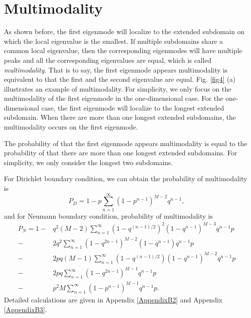 \documentclass[a4paper,11pt]{article}
\begin{document}
\section{Multimodality}\label{multimodality}

As shown before, the first eigenmode will localize to the extended subdomain on which the local eigenvalue is the smallest. If multiple subdomains share a common local eigenvalue, then the corresponding eigenmodes will have multiple peaks and all the corresponding eigenvalues are equal, which is called \emph{multimodality}. That is to say, the first eigenmode appears multimodality is equivalent to that the first and the second eigenvalue are equal. Fig. \ref{fig4} (a) illustrates an example of multimodality. For simplicity, we only focus on the multimodality of the first eigenmode in the one-dimensional case. For the one-dimensional case, the first eigenmode will localize to the longest extended subdomain. When there are more than one longest extended subdomains, the multimodality occurs on the first eigenmode.

The probability of that the first eigenmode appears multimodality is equal to the probability of that there are more than one longest extended subdomains. For simplicity, we only consider the longest two subdomains.

For Dirichlet boundary condition, we can obtain the probability of multimodality is
\begin{equation}\label{multiD}
P_D = 1 - p \sum_{n=1}^{\infty} (1 - p^{n-1})^{M-2} q^{n-1},
\end{equation}
and for Neumann boundary condition, probability of multimodality is
\begin{equation}\label{multiN}
\begin{split}
P_N = 1 - & q^2 (M-2) \sum_{n=1}^{\infty} (1 - q^{(n-1)/2})^2 (1 - q^{n-1})^{M-3} q^{n-1} p \\
- & 2 q^2 \sum_{n=1}^{\infty} (1 - q^{2n-1})^{M-2} (1 - q^{n-1}) q^{n-1} p \\
- & 2 p q (M-1) \sum_{n=1}^{\infty} (1 - q^{(n-1)/2}) (1 - q^{n-1})^{M-2} q^{n-1} p \\
- & 2 p q \sum_{n=1}^{\infty} (1 - q^{2n-1})^{M-1} q^{n-1} p \\
- & p^2 M \sum_{n=1}^{\infty} (1 - p^{n-1})^{M-1} q^{n-1} p.
\end{split}
\end{equation}
Detailed calculations are given in Appendix \ref{AppendixB2} and Appendix \ref{AppendixB3}.
\end{document}
